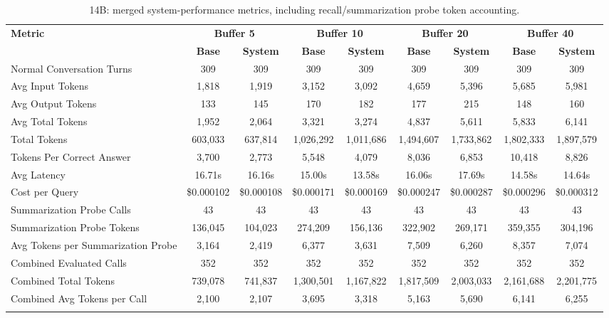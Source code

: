 \documentclass[pdflatex,sn-mathphys-num]{sn-jnl}%
\theoremstyle{thmstyleone}%
\theoremstyle{thmstyletwo}%
\theoremstyle{thmstylethree}%
\begin{document}
\begin{table}[htbp]
\caption{14B: merged system-performance metrics, including recall/summarization probe token accounting.}\label{tab:14b_perf_main}
\centering
\tiny
\setlength{\tabcolsep}{2.2pt}
\begin{adjustbox}{width=\textwidth}
\begin{tabular}{lcccccccc}
\toprule
\textbf{Metric} & \multicolumn{2}{c}{\textbf{Buffer 5}} & \multicolumn{2}{c}{\textbf{Buffer 10}} & \multicolumn{2}{c}{\textbf{Buffer 20}} & \multicolumn{2}{c}{\textbf{Buffer 40}} \\
\cmidrule(lr){2-3}\cmidrule(lr){4-5}\cmidrule(lr){6-7}\cmidrule(lr){8-9}
 & \textbf{Base} & \textbf{System} & \textbf{Base} & \textbf{System} & \textbf{Base} & \textbf{System} & \textbf{Base} & \textbf{System} \\
\midrule
Normal Conversation Turns & 309 & 309 & 309 & 309 & 309 & 309 & 309 & 309 \\
Avg Input Tokens & 1,818 & 1,919 & 3,152 & 3,092 & 4,659 & 5,396 & 5,685 & 5,981 \\
Avg Output Tokens & 133 & 145 & 170 & 182 & 177 & 215 & 148 & 160 \\
Avg Total Tokens & 1,952 & 2,064 & 3,321 & 3,274 & 4,837 & 5,611 & 5,833 & 6,141 \\
Total Tokens & 603,033 & 637,814 & 1,026,292 & 1,011,686 & 1,494,607 & 1,733,862 & 1,802,333 & 1,897,579 \\
Tokens Per Correct Answer & 3,700 & 2,773 & 5,548 & 4,079 & 8,036 & 6,853 & 10,418 & 8,826 \\
Avg Latency & 16.71s & 16.16s & 15.00s & 13.58s & 16.06s & 17.69s & 14.58s & 14.64s \\
Cost per Query & \$0.000102 & \$0.000108 & \$0.000171 & \$0.000169 & \$0.000247 & \$0.000287 & \$0.000296 & \$0.000312 \\
Summarization Probe Calls & 43 & 43 & 43 & 43 & 43 & 43 & 43 & 43 \\
Summarization Probe Tokens & 136,045 & 104,023 & 274,209 & 156,136 & 322,902 & 269,171 & 359,355 & 304,196 \\
Avg Tokens per Summarization Probe & 3,164 & 2,419 & 6,377 & 3,631 & 7,509 & 6,260 & 8,357 & 7,074 \\
Combined Evaluated Calls & 352 & 352 & 352 & 352 & 352 & 352 & 352 & 352 \\
Combined Total Tokens & 739,078 & 741,837 & 1,300,501 & 1,167,822 & 1,817,509 & 2,003,033 & 2,161,688 & 2,201,775 \\
Combined Avg Tokens per Call & 2,100 & 2,107 & 3,695 & 3,318 & 5,163 & 5,690 & 6,141 & 6,255 \\
\botrule
\end{tabular}
\end{adjustbox}
\end{table}
\end{document}
